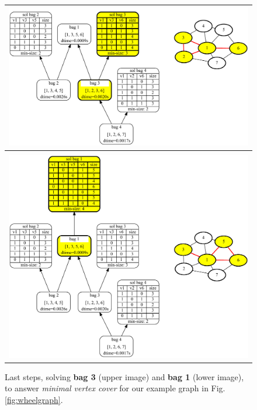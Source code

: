 \documentclass[a4paper, 12pt, bibliography=totoc]{scrartcl}
\begin{document}
\begin{figure}[H]
	\centering
	\begin{tabular}{c}
		\includegraphics[width=0.99\linewidth]{images/WheelGraph7/combined4.pdf} \\
		\hline 	\\		
		\includegraphics[width=0.95\linewidth]{images/WheelGraph7/combined5.pdf}
	\end{tabular}
	
	\caption[Last steps to solve \textit{minimal vertex cover} for example graph \ref{fig:wheelgraph}]{Last steps, solving \textbf{bag 3} (upper image) and \textbf{bag 1} (lower image), to answer \textit{minimal vertex cover} for our example graph in Fig. \ref{fig:wheelgraph}.}
	\label{fig:wheelgraphc45}
\end{figure}


\end{document}

